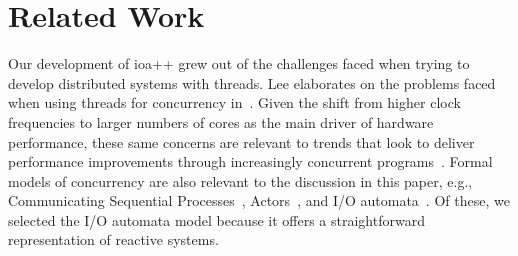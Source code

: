 \section{Related Work\label{related_work}}

Our development of ioa++ grew out of the challenges faced when trying to develop distributed systems with threads.
Lee elaborates on the problems faced when using threads for concurrency in~\cite{lee2006problem}.
Given the shift from higher clock frequencies to larger numbers of cores as the main driver of hardware performance, these same concerns are relevant to trends that look to deliver performance improvements through increasingly concurrent programs~\cite{sutter2005software}.
Formal models of concurrency are also relevant to the discussion in this paper, e.g., Communicating Sequential Processes~\cite{hoare1978communicating}, Actors~\cite{agha1986actors}, and I/O automata~\cite{lynch1996distributed}.
Of these, we selected the I/O automata model because it offers a straightforward representation of reactive systems.




